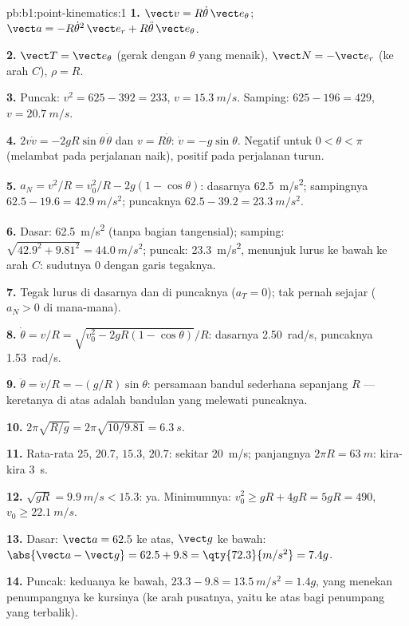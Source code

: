 \begin{solution}{pb:b1:point-kinematics:1}
\textbf{1.} $\vect v = R\dot\theta\,\vect e_\theta$; $\vect a = -R\dot\theta^2
\,\vect e_r + R\ddot\theta\,\vect e_\theta$.

\textbf{2.} $\vect T = \vect e_\theta$ (gerak dengan $\theta$ yang menaik),
$\vect N = -\vect e_r$ (ke arah $C$), $\rho = R$.

\textbf{3.} Puncak: $v^2 = 625 - 392 = 233$, $v = \qty{15.3}{m/s}$. Samping:
$625 - 196 = 429$, $v = \qty{20.7}{m/s}$.

\textbf{4.} $2v\dot v = -2gR\sin\theta\,\dot\theta$ dan $v = R\dot\theta$:
$\dot v = -g\sin\theta$. Negatif untuk $0 < \theta < \pi$ (melambat pada
perjalanan naik), positif pada perjalanan turun.

\textbf{5.} $a_N = v^2/R = v_0^2/R - 2g(1 - \cos\theta)$: dasarnya
\qty{62.5}{m/s^2}; sampingnya $62.5 - 19.6 = \qty{42.9}{m/s^2}$; puncaknya $62.5 -
39.2 = \qty{23.3}{m/s^2}$.

\textbf{6.} Dasar: \qty{62.5}{m/s^2} (tanpa bagian tangensial); samping:
$\sqrt{42.9^2 + 9.81^2} = \qty{44.0}{m/s^2}$; puncak: \qty{23.3}{m/s^2},
menunjuk lurus ke bawah ke arah $C$: sudutnya $0$ dengan garis tegaknya.

\textbf{7.} Tegak lurus di dasarnya dan di puncaknya ($a_T = 0$); tak
pernah sejajar ($a_N > 0$ di mana-mana).

\textbf{8.} $\dot\theta = v/R = \sqrt{v_0^2 - 2gR(1 - \cos\theta)}/R$:
dasarnya \qty{2.50}{rad/s}, puncaknya \qty{1.53}{rad/s}.

\textbf{9.} $\ddot\theta = \dot v/R = -(g/R)\sin\theta$: persamaan bandul
sederhana sepanjang $R$ --- keretanya di atas  adalah bandulan
yang melewati puncaknya.

\textbf{10.} $2\pi\sqrt{R/g} = 2\pi\sqrt{10/9.81} = \qty{6.3}{s}$.

\textbf{11.} Rata-rata $25$, $20.7$, $15.3$, $20.7$: sekitar \qty{20}{m/s};
panjangnya $2\pi R = \qty{63}{m}$: kira-kira \qty{3}{s}.

\textbf{12.} $\sqrt{gR} = \qty{9.9}{m/s} < 15.3$: ya. Minimumnya: $v_0^2 \geq
gR + 4gR = 5gR = 490$, $v_0 \geq \qty{22.1}{m/s}$.

\textbf{13.} Dasar: $\vect a = 62.5$ ke atas, $\vect g$ ke bawah:
$\abs{\vect a - \vect g} = 62.5 + 9.8 = \qty{72.3}{m/s^2} = 7.4g$.

\textbf{14.} Puncak: keduanya ke bawah, $23.3 - 9.8 = \qty{13.5}{m/s^2} = 1.4g$,
yang menekan penumpangnya ke kursinya (ke arah pusatnya, yaitu ke atas
bagi penumpang yang terbalik).


\end{solution}
